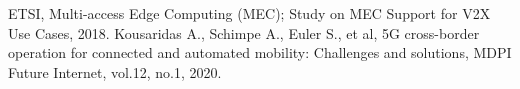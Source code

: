 \documentclass[a4paper,10pt,twocolumn,uplatex]{jsarticle}
\begin{document}
\footnotesize{
  \begin{thebibliography}{99}
     ETSI, Multi-access Edge Computing (MEC); Study on MEC Support for V2X Use Cases, 2018.
     Kousaridas A., Schimpe A., Euler S., et al, 5G cross-border operation for connected and automated mobility: Challenges and solutions, MDPI Future Internet, vol.12, no.1, 2020.
  \end{thebibliography}
}

% 
% 

\end{document}
